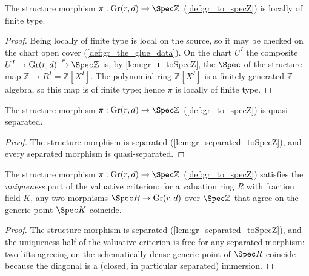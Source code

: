 \begin{lemma}

  \label{lem:gr_locallyOfFiniteType_toSpecZ}
  The structure morphism \(\pi : \mathrm{Gr}(r,d) \to \Spec \mathbb{Z}\)
  (\cref{def:gr_to_specZ}) is locally of finite type.
\end{lemma}
\begin{proof}
  \leanok
  Being locally of finite type is local on the source, so it may be checked on the
  chart open cover (\cref{def:gr_the_glue_data}). On the chart \(U^I\) the composite
  \(U^I \to \mathrm{Gr}(r,d) \xrightarrow{\pi} \Spec \mathbb{Z}\) is, by
  \cref{lem:gr_ι_toSpecZ}, the \(\Spec\) of the structure map \(\mathbb{Z} \to R^I
  = \mathbb{Z}[X^I]\). The polynomial ring \(\mathbb{Z}[X^I]\) is a finitely
  generated \(\mathbb{Z}\)-algebra, so this map is of finite type; hence \(\pi\) is
  locally of finite type.
\end{proof}

\begin{lemma}

  \label{lem:gr_quasiSeparated_toSpecZ}
  The structure morphism \(\pi : \mathrm{Gr}(r,d) \to \Spec \mathbb{Z}\)
  (\cref{def:gr_to_specZ}) is quasi-separated.
\end{lemma}
\begin{proof}
  \leanok
  The structure morphism is separated (\cref{lem:gr_separated_toSpecZ}), and every
  separated morphism is quasi-separated.
\end{proof}

\begin{lemma}

  \label{lem:gr_valuativeUniqueness_toSpecZ}
  The structure morphism \(\pi : \mathrm{Gr}(r,d) \to \Spec \mathbb{Z}\)
  (\cref{def:gr_to_specZ}) satisfies the \emph{uniqueness} part of the valuative
  criterion: for a valuation ring \(R\) with fraction field \(K\), any two
  morphisms \(\Spec R \to \mathrm{Gr}(r,d)\) over \(\Spec \mathbb{Z}\) that agree
  on the generic point \(\Spec K\) coincide.
\end{lemma}
\begin{proof}
  \leanok
  The structure morphism is separated (\cref{lem:gr_separated_toSpecZ}), and the
  uniqueness half of the valuative criterion is free for any separated morphism:
  two lifts agreeing on the schematically dense generic point of \(\Spec R\)
  coincide because the diagonal is a (closed, in particular separated) immersion.
\end{proof}


